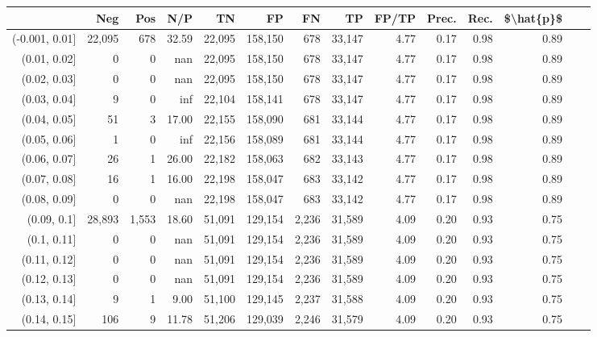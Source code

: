 \begin{tabular}{rrrrrrrrrrrrrr}
\toprule
{} &     Neg &    Pos &    N/P &       TN &       FP &      FN &      TP & FP/TP & Prec. &  Rec. & \$\textbackslash hat\{p\}\$ \\
\midrule
(-0.001, 0.01] &  22,095 &    678 &  32.59 &   22,095 &  158,150 &     678 &  33,147 &  4.77 &  0.17 &  0.98 &      0.89 \\
(0.01, 0.02]   &       0 &      0 &    nan &   22,095 &  158,150 &     678 &  33,147 &  4.77 &  0.17 &  0.98 &      0.89 \\
(0.02, 0.03]   &       0 &      0 &    nan &   22,095 &  158,150 &     678 &  33,147 &  4.77 &  0.17 &  0.98 &      0.89 \\
(0.03, 0.04]   &       9 &      0 &    inf &   22,104 &  158,141 &     678 &  33,147 &  4.77 &  0.17 &  0.98 &      0.89 \\
(0.04, 0.05]   &      51 &      3 &  17.00 &   22,155 &  158,090 &     681 &  33,144 &  4.77 &  0.17 &  0.98 &      0.89 \\
(0.05, 0.06]   &       1 &      0 &    inf &   22,156 &  158,089 &     681 &  33,144 &  4.77 &  0.17 &  0.98 &      0.89 \\
(0.06, 0.07]   &      26 &      1 &  26.00 &   22,182 &  158,063 &     682 &  33,143 &  4.77 &  0.17 &  0.98 &      0.89 \\
(0.07, 0.08]   &      16 &      1 &  16.00 &   22,198 &  158,047 &     683 &  33,142 &  4.77 &  0.17 &  0.98 &      0.89 \\
(0.08, 0.09]   &       0 &      0 &    nan &   22,198 &  158,047 &     683 &  33,142 &  4.77 &  0.17 &  0.98 &      0.89 \\
(0.09, 0.1]    &  28,893 &  1,553 &  18.60 &   51,091 &  129,154 &   2,236 &  31,589 &  4.09 &  0.20 &  0.93 &      0.75 \\
(0.1, 0.11]    &       0 &      0 &    nan &   51,091 &  129,154 &   2,236 &  31,589 &  4.09 &  0.20 &  0.93 &      0.75 \\
(0.11, 0.12]   &       0 &      0 &    nan &   51,091 &  129,154 &   2,236 &  31,589 &  4.09 &  0.20 &  0.93 &      0.75 \\
(0.12, 0.13]   &       0 &      0 &    nan &   51,091 &  129,154 &   2,236 &  31,589 &  4.09 &  0.20 &  0.93 &      0.75 \\
(0.13, 0.14]   &       9 &      1 &   9.00 &   51,100 &  129,145 &   2,237 &  31,588 &  4.09 &  0.20 &  0.93 &      0.75 \\
(0.14, 0.15]   &     106 &      9 &  11.78 &   51,206 &  129,039 &   2,246 &  31,579 &  4.09 &  0.20 &  0.93 &      0.75 \\

\end{tabular}
